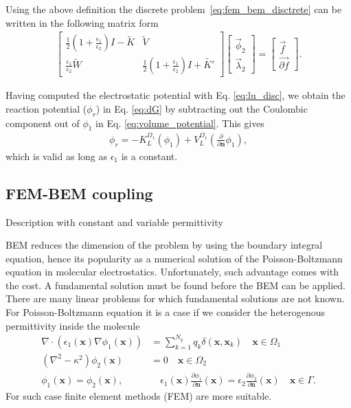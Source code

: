 Using the above definition the discrete problem~\eqref{eq:fem_bem_disctrete} can be written in the following matrix form
\begin{align*}
\begin{bmatrix}
 \tfrac12 \left(1+\tfrac{\epsilon_1}{\epsilon_2}\right) I - \widetilde{K}  & \widetilde{V}  \\  
 \tfrac{\epsilon_1}{\epsilon_2} \widetilde{W} & \tfrac12 \left(1+\tfrac{\epsilon_1}{\epsilon_2}\right) I + \widetilde{K'}
\end{bmatrix}
\begin{bmatrix}
\vec{\phi}_2 \\
\vec{\lambda}_2 
\end{bmatrix}
= 
\begin{bmatrix}
\vec{f} \\  
\vec{\partial f}
\end{bmatrix}.
\end{align*}
%

Having computed the electrostatic potential with Eq. \eqref{eq:lu_disc}, we obtain the reaction potential ($\phi_r$) in Eq. \eqref{eq:dG} by subtracting out the Coulombic component out of $\phi_1$ in Eq. \eqref{eq:volume_potential}. This gives
%
\begin{align} \label{eq:phi_reac}
\phi_{r} = - K_{L}^{\Omega_1}(\phi_1) + V_{L}^{\Omega_1} \left(\frac{\partial}{\partial \mathbf{n}}  \phi_1  \right),
\end{align}
%
which is valid as long as $\epsilon_1$ is a constant.

\subsection*{\sffamily \normalsize FEM-BEM coupling}

{\sffamily \small Description with constant and variable permittivity} 

BEM reduces the dimension of the problem by using the boundary integral equation, hence its popularity as a numerical solution of  the Poisson-Boltzmann equation in molecular electrostatics. Unfortunately, such advantage comes with the cost. A fundamental solution must be found before the BEM can be applied. There are many linear problems for which fundamental solutions are not known. For Poisson-Boltzmann equation it is a case if we consider the heterogenous permittivity inside the molecule
   \begin{align} \label{eq:pbe_vp}
\nabla \cdot \left(\epsilon_1(\mathbf{x}) \nabla \phi_1(\mathbf{x})\right) &= \sum_{k=1}^{N_q} q_k\delta(\mathbf{x},\mathbf{x}_k) \quad  \mathbf{x} \in \Omega_1\nonumber\\
\left(\nabla^2 - \kappa^2\right)\phi_2(\mathbf{x})  &= 0 \quad\mathbf{x}\in\Omega_2\nonumber\\
\phi_1(\mathbf{x})  = \phi_2(\mathbf{x}),  &\quad \epsilon_1(\mathbf{x})\frac{\partial\phi_1}{\partial\mathbf{n}}(\mathbf{x})  = \epsilon_2\frac{\partial\phi_2}{\partial\mathbf{n}}(\mathbf{x})  \quad \mathbf{x}\in \Gamma. 
\end{align}
For such case finite element methods (FEM) are more suitable.

